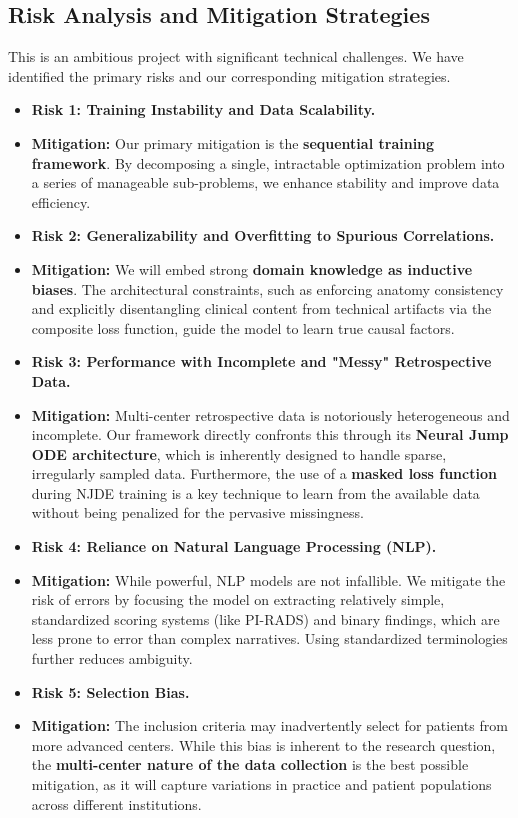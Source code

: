 \documentclass[11pt, a4paper]{article}
\begin{document}
\subsection{Risk Analysis and Mitigation Strategies}
This is an ambitious project with significant technical challenges. We have identified the primary risks and our corresponding mitigation strategies.
\begin{itemize}
    \item \textbf{Risk 1: Training Instability and Data Scalability.}
    \item \textbf{Mitigation:} Our primary mitigation is the \textbf{sequential training framework}. By decomposing a single, intractable optimization problem into a series of manageable sub-problems, we enhance stability and improve data efficiency.
    
    \item \textbf{Risk 2: Generalizability and Overfitting to Spurious Correlations.}
    \item \textbf{Mitigation:} We will embed strong \textbf{domain knowledge as inductive biases}. The architectural constraints, such as enforcing anatomy consistency and explicitly disentangling clinical content from technical artifacts via the composite loss function, guide the model to learn true causal factors.
    
    \item \textbf{Risk 3: Performance with Incomplete and "Messy" Retrospective Data.}
    \item \textbf{Mitigation:} Multi-center retrospective data is notoriously heterogeneous and incomplete. Our framework directly confronts this through its \textbf{Neural Jump ODE architecture}, which is inherently designed to handle sparse, irregularly sampled data. Furthermore, the use of a \textbf{masked loss function} during NJDE training is a key technique to learn from the available data without being penalized for the pervasive missingness.

    \item \textbf{Risk 4: Reliance on Natural Language Processing (NLP).}
    \item \textbf{Mitigation:} While powerful, NLP models are not infallible. We mitigate the risk of errors by focusing the model on extracting relatively simple, standardized scoring systems (like PI-RADS) and binary findings, which are less prone to error than complex narratives. Using standardized terminologies further reduces ambiguity.

    \item \textbf{Risk 5: Selection Bias.}
    \item \textbf{Mitigation:} The inclusion criteria may inadvertently select for patients from more advanced centers. While this bias is inherent to the research question, the \textbf{multi-center nature of the data collection} is the best possible mitigation, as it will capture variations in practice and patient populations across different institutions.
    

\end{itemize}
\end{document}
